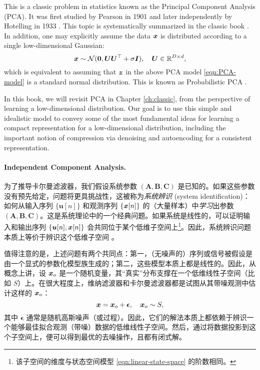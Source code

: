 \documentclass[../../book-main.tex]{subfiles}
\begin{document}
This is a classic problem in statistics known as the Principal Component Analysis (PCA). It was first studied by Pearson in 1901 \cite{Pearson1901} and later independently by Hotelling in 1933 \cite{Hotelling1933}. This topic is systematically summarized in the classic book \cite{Jolliffe1986,JolliffeI2002}.
In addition, one may explicitly assume the data $\bm{x}$ is distributed according to a single low-dimensional Gaussian:
\begin{equation}
    \bm{x} \sim \mathcal{N}(\boldsymbol{0}, \boldsymbol{U}\boldsymbol{U}^\top + \sigma \bm{I}), \quad \boldsymbol{U} \in \mathbb{R}^{D\times d},
\end{equation}
which is equivalent to assuming that  $\bm{z}$ in the above PCA model \eqref{eqn:PCA-model} is a standard normal distribution. 
This is known as Probabilistic PCA \cite{TippingM1999}. 

In this book, we will revisit  PCA in Chapter \ref{ch:classic}, from the perspective of learning a low-dimensional distribution. Our goal is to use this simple and idealistic model to convey some of the most fundamental ideas for learning a compact representation for a low-dimensional distribution, including the important notion of compression via denoising and autoencoding for a consistent representation.

\paragraph{Independent Component Analysis.}

为了推导卡尔曼滤波器，我们假设系统参数 $(\boldsymbol{A}, \boldsymbol{B}, \boldsymbol{C})$ 是已知的。如果这些参数没有预先给定，问题将更具挑战性，这被称为{\em 系统辨识} (system identification)：如何从输入序列 $\{\boldsymbol{u}[n]\}$ 和观测序列 $\{\bm{x}[n]\}$ 的（大量样本）中{\em 学习}出参数 $(\boldsymbol{A}, \boldsymbol{B}, \boldsymbol{C})$。这是系统理论中的一个经典问题。如果系统是线性的，可以证明输入和输出序列 $\{\boldsymbol{u}[n], \bm{x}[n]\}$ 会共同位于某个低维子空间上\footnote{该子空间的维度与状态空间模型 \eqref{eqn:linear-state-space} 的阶数相同。}。因此，系统辨识问题本质上等价于辨识这个低维子空间 \cite{OverscheeP1996,Liu-2009-CDC,Liu-2010-SIAM}。

值得注意的是，上述问题有两个共同点：第一，（无噪声的）序列或信号被假设是由一个显式的参数化模型族生成的；第二，这些模型本质上都是线性的。因此，从概念上讲，设 $\bm{x}_o$ 是一个随机变量，其“真实”分布支撑在一个低维线性子空间（比如 $S$）上。在很大程度上，维纳滤波器和卡尔曼滤波器都是试图从其带噪观测中估计这样的 $\bm{x}_o$：
\begin{equation}
    \bm{x} = \bm{x}_o + \boldsymbol{\epsilon}, \quad \bm{x}_o \sim S, 
\end{equation}
其中 $\boldsymbol{\epsilon}$ 通常是随机高斯噪声（或过程）。因此，它们的解法本质上都依赖于辨识一个能够最佳拟合观测（带噪）数据的低维线性子空间。然后，通过将数据投影到这个子空间上，便可以得到最优的去噪操作，且都有闭式解。
\end{document}
